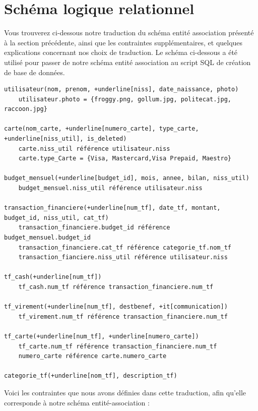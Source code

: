 \documentclass[a4paper,12pt]{article}
\begin{document}
\newpage 

\section{Schéma logique relationnel}

Vous trouverez ci-dessous notre traduction du schéma entité association présenté à la section précédente, ainsi que les contraintes supplémentaires, et quelques explications concernant nos choix de traduction.
Le schéma ci-dessous a été utilisé pour passer de notre schéma entité association au script SQL de création de base de données.

\begin{Verbatim}[commandchars=+\[\]]
utilisateur(nom, prenom, +underline[niss], date_naissance, photo)
	utilisateur.photo = {froggy.png, gollum.jpg, politecat.jpg, raccoon.jpg}

carte(nom_carte, +underline[numero_carte], type_carte, +underline[niss_util], is_deleted)
	carte.niss_util référence utilisateur.niss
	carte.type_Carte = {Visa, Mastercard,Visa Prepaid, Maestro}

budget_mensuel(+underline[budget_id], mois, annee, bilan, niss_util) 
	budget_mensuel.niss_util référence utilisateur.niss

transaction_financiere(+underline[num_tf], date_tf, montant, budget_id, niss_util, cat_tf)
	transaction_financiere.budget_id référence budget_mensuel.budget_id
	transaction_financiere.cat_tf référence categorie_tf.nom_tf
	transaction_fianciere.niss_util référence utilisateur.niss

tf_cash(+underline[num_tf])
	tf_cash.num_tf référence transaction_financiere.num_tf

tf_virement(+underline[num_tf], destbenef, +it[communication])
	tf_virement.num_tf référence transaction_financiere.num_tf

tf_carte(+underline[num_tf], +underline[numero_carte])
	tf_carte.num_tf référence transaction_financiere.num_tf	
	numero_carte référence carte.numero_carte

categorie_tf(+underline[nom_tf], description_tf)
\end{Verbatim}

Voici les contraintes que nous avons définies dans cette traduction, afin qu'elle corresponde à notre schéma entité-association :
\end{document}
